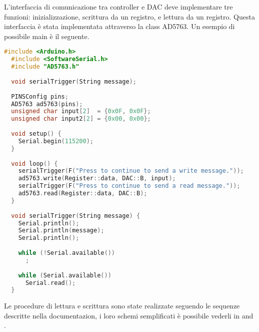 
L'interfaccia di comunicazione tra controller e DAC deve implementare tre funzioni: inizializzazione, scrittura da un registro, e lettura da un registro. Questa interfaccia è stata implementata attraverso la class AD5763. Un esempio di possibile main è il seguente.

\begin{lstlisting}[language=c++, gobble=2]
  #include <Arduino.h>
  #include <SoftwareSerial.h>
  #include "AD5763.h"
  
  void serialTrigger(String message);
  
  PINSConfig pins;
  AD5763 ad5763(pins);
  unsigned char input[2]  = {0x0F, 0x0F};
  unsigned char input2[2] = {0x00, 0x00};
  
  void setup() {
    Serial.begin(115200);
  }
  
  void loop() {
    serialTrigger(F("Press to continue to send a write message."));
    ad5763.write(Register::data, DAC::B, input);
    serialTrigger(F("Press to continue to send a read message."));
    ad5763.read(Register::data, DAC::B);
  }
  
  void serialTrigger(String message) {
    Serial.println();
    Serial.println(message);
    Serial.println();
  
    while (!Serial.available())
      ;
  
    while (Serial.available())
      Serial.read();
  }
\end{lstlisting}

Le procedure di lettura e scrittura sono state realizzate seguendo le sequenze descritte nella documentazion, i loro schemi semplificati è possibile vederli in  and .